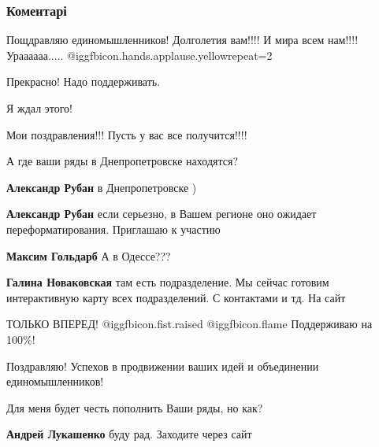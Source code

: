  
 
 
 
 
\subsubsection{Коментарі}

\begin{itemize} %

Пощдравляю единомышленников! Долголетия вам!!!! И мира всем нам!!!!
Ураааааа..... @igg{fbicon.hands.applause.yellow}{repeat=2} 

Прекрасно! Надо поддерживать.

Я ждал этого!

Мои поздравления!!! Пусть у вас все получится!!!!

А где ваши ряды в Днепропетровске находятся?

\begin{itemize} %
\textbf{Александр Рубан} в Днепропетровске )

\textbf{Александр Рубан} если серьезно, в Вашем регионе оно ожидает переформатирования. Приглашаю к участию

\textbf{Максим Гольдарб} А в Одессе???

\textbf{Галина Новаковская} там есть подразделение. Мы сейчас готовим интерактивную карту всех подразделений. С контактами и тд. На сайт
\end{itemize} %

ТОЛЬКО ВПЕРЕД!  @igg{fbicon.fist.raised}  @igg{fbicon.flame} 
Поддерживаю на 100\%!

Поздравляю! Успехов в продвижении ваших идей и объединении единомышленников!

Для меня будет честь пополнить Ваши ряды, но как?

\begin{itemize} %
\textbf{Андрей Лукашенко} буду рад. Заходите через сайт


\end{itemize}
\end{itemize}

